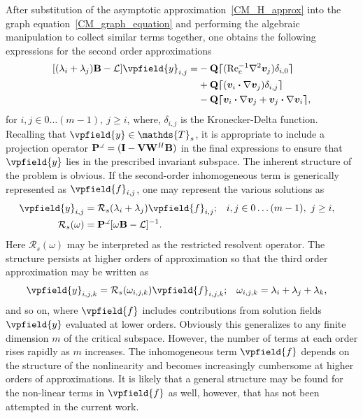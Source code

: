 After substitution of the asymptotic approximation~\eqref{CM_H_approx} into the graph equation~\eqref{CM_graph_equation} and performing the algebraic manipulation to collect similar terms together, one obtains the following expressions for the second order approximations
\begin{equation}
	\label{second_order_expressions}
	\begin{aligned}
		[(\lambda_{i} + \lambda_{j})\mathbf{B} -  \mathcal{L}]\vpfield{y}_{i,j} = &
		-\mathbf{Q}\blbracket (\invRec\nabla^{2}\vfield{v}_{j})\delta_{i,0}\brbracket \\
		 & +\mathbf{Q}\blbracket (\vfield{v}_{i}\bcdot\nabla\vfield{v}_{j}) \delta_{i,j}\brbracket \\
		& -\mathbf{Q}\blbracket\vfield{v}_{i}\bcdot\nabla\vfield{v}_{j}
		+\vfield{v}_{j}\bcdot\nabla\vfield{v}_{i}
		\brbracket,
	\end{aligned}  
\end{equation}
for $i,j \in 0\ldots (m-1), \  j\ge i$, where, $\delta_{i,j}$ is the Kronecker-Delta function. Recalling that $\vpfield{y}\in\mathds{T}_{s}$, it is appropriate to include a projection operator $\mathbf{P}^{\obliquesymbol{}} = (\mathbf{I} - \mathbf{V}\mathbf{W}^{H}\mathbf{B})$ in the final expressions to ensure that $\vpfield{y}$ lies in the prescribed invariant subspace. The inherent structure of the problem is obvious. If the second-order inhomogeneous term is generically represented as $\vpfield{f}_{i,j}$, one may represent the various solutions as
\begin{eqnarray}
	\label{general_second_order_expression}
	\begin{aligned}
		\vpfield{y}_{i,j} &= \mathcal{R}_{s}(\lambda_{i} + \lambda_{j})\vpfield{f}_{i,j}; &i,j \in 0\ldots (m-1), \  j\ge i, && \\
		\mathcal{R}_{s}(\omega) &= \mathbf{P}^{\obliquesymbol{}}[\omega\mathbf{B} -  \mathcal{L}]^{-1}. &  &&
	\end{aligned}
\end{eqnarray}
Here $\mathcal{R}_{s}(\omega)$ may be interpreted as the restricted resolvent operator. The structure persists at higher orders of approximation so that the third order approximation may be written as 
\begin{equation}
	\label{general_higher_order_expression}
	\begin{aligned}
		\vpfield{y}_{i,j,k} &= \mathcal{R}_{s}(\omega_{i,j,k})\vpfield{f}_{i,j,k}; 
		& \omega_{i,j,k} = \lambda_{i} + \lambda_{j} + \lambda_{k}, 		&&
	\end{aligned}
\end{equation}
and so on, where $\vpfield{f}$ includes contributions from solution fields $\vpfield{y}$ evaluated at lower orders. Obviously this generalizes to any finite dimension $m$ of the critical subspace. However, the number of terms at each order rises rapidly as $m$ increases. The inhomogeneous term $\vpfield{f}$ depends on the structure of the nonlinearity and becomes increasingly cumbersome at higher orders of approximations. It is likely that a general structure may be found for the non-linear terms in $\vpfield{f}$ as well, however, that has not been attempted in the current work. 

